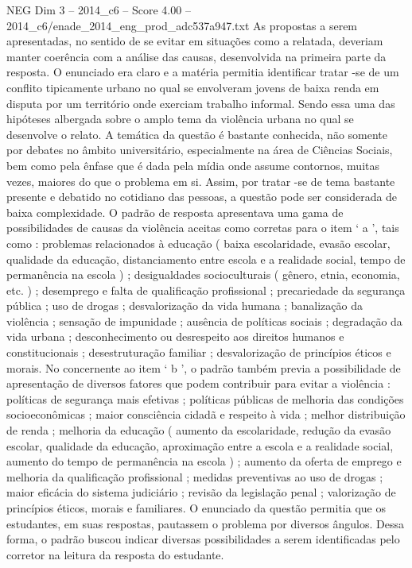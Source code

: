 \begin{textsample}{NEG Dim 3 – 2014\_c6 – Score 4.00 – 2014\_c6/enade\_2014\_eng\_prod\_adc537a947.txt}
As propostas a serem apresentadas, no sentido de se evitar em situações como a relatada, deveriam manter coerência com a análise das causas, desenvolvida na primeira parte da resposta.
O enunciado era claro e a matéria permitia identificar tratar -se de um conflito tipicamente urbano no qual se envolveram jovens de baixa renda em disputa por um território onde exerciam trabalho informal.
Sendo essa uma das hipóteses albergada sobre o amplo tema da violência urbana no qual se desenvolve o relato.
A temática da questão é bastante conhecida, não somente por debates no âmbito universitário, especialmente na área de Ciências Sociais, bem como pela ênfase que é dada pela mídia onde assume contornos, muitas vezes, maiores do que o problema em si.
Assim, por tratar -se de tema bastante presente e debatido no cotidiano das pessoas, a questão pode ser considerada de baixa complexidade.
O padrão de resposta apresentava uma gama de possibilidades de causas da violência aceitas como corretas para o item ‘ a ’, tais como : problemas relacionados à educação ( baixa escolaridade, evasão escolar, qualidade da educação, distanciamento entre escola e a realidade social, tempo de permanência na escola ) ; desigualdades socioculturais ( gênero, etnia, economia, etc. ) ; desemprego e falta de qualificação profissional ; precariedade da segurança pública ; uso de drogas ; desvalorização da vida humana ; banalização da violência ; sensação de impunidade ; ausência de políticas sociais ; degradação da vida urbana ; desconhecimento ou desrespeito aos direitos humanos e constitucionais ; desestruturação familiar ; desvalorização de princípios éticos e morais.
No concernente ao item ‘ b ’, o padrão também previa a possibilidade de apresentação de diversos fatores que podem contribuir para evitar a violência : políticas de segurança mais efetivas ; políticas públicas de melhoria das condições socioeconômicas ; maior consciência cidadã e respeito à vida ; melhor distribuição de renda ; melhoria da educação ( aumento da escolaridade, redução da evasão escolar, qualidade da educação, aproximação entre a escola e a realidade social, aumento do tempo de permanência na escola ) ; aumento da oferta de emprego e melhoria da qualificação profissional ; medidas preventivas ao uso de drogas ; maior eficácia do sistema judiciário ; revisão da legislação penal ; valorização de princípios éticos, morais e familiares.
O enunciado da questão permitia que os estudantes, em suas respostas, pautassem o problema por diversos ângulos.
Dessa forma, o padrão buscou indicar diversas possibilidades a serem identificadas pelo corretor na leitura da resposta do estudante.

\end{textsample}
